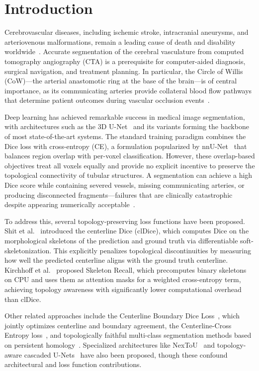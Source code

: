 \documentclass[conference]{IEEEtran}
\begin{document}
\section{Introduction}

Cerebrovascular diseases, including ischemic stroke, intracranial aneurysms, and arteriovenous malformations, remain a leading cause of death and disability worldwide~\cite{chen2023}. Accurate segmentation of the cerebral vasculature from computed tomography angiography (CTA) is a prerequisite for computer-aided diagnosis, surgical navigation, and treatment planning. In particular, the Circle of Willis (CoW)---the arterial anastomotic ring at the base of the brain---is of central importance, as its communicating arteries provide collateral blood flow pathways that determine patient outcomes during vascular occlusion events~\cite{yang2023}.

Deep learning has achieved remarkable success in medical image segmentation, with architectures such as the 3D U-Net~\cite{isensee2021} and its variants forming the backbone of most state-of-the-art systems. The standard training paradigm combines the Dice loss with cross-entropy (CE), a formulation popularized by nnU-Net~\cite{isensee2024} that balances region overlap with per-voxel classification. However, these overlap-based objectives treat all voxels equally and provide no explicit incentive to preserve the topological connectivity of tubular structures. A segmentation can achieve a high Dice score while containing severed vessels, missing communicating arteries, or producing disconnected fragments---failures that are clinically catastrophic despite appearing numerically acceptable~\cite{shit2021}.

To address this, several topology-preserving loss functions have been proposed. Shit et al.~\cite{shit2021} introduced the centerline Dice (clDice), which computes Dice on the morphological skeletons of the prediction and ground truth via differentiable soft-skeletonization. This explicitly penalizes topological discontinuities by measuring how well the predicted centerline aligns with the ground truth centerline. Kirchhoff et al.~\cite{kirchhoff2024} proposed Skeleton Recall, which precomputes binary skeletons on CPU and uses them as attention masks for a weighted cross-entropy term, achieving topology awareness with significantly lower computational overhead than clDice.

Other related approaches include the Centerline Boundary Dice Loss~\cite{shi2024cbd}, which jointly optimizes centerline and boundary agreement, the Centerline-Cross Entropy loss~\cite{acebes2024}, and topologically faithful multi-class segmentation methods based on persistent homology~\cite{berger2024, stucki2023}. Specialized architectures like NexToU~\cite{shi2023nextou} and topology-aware cascaded U-Nets~\cite{rouge2024} have also been proposed, though these confound architectural and loss function contributions.
\end{document}
